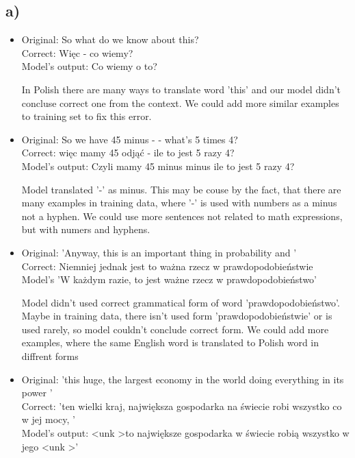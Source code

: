 \documentclass[12pt]{article}
\begin{document}
\subsection*{a) }

\begin{itemize}
  \item Original: So what do we know about this?\\
        Correct: Więc - co wiemy?\\
        Model's output: Co wiemy o to?
        
        In Polish there are many ways to translate word 'this' and  our model didn't concluse correct one from the context. We could add more similar examples to training set to fix this error.
        
  \item Original: So we have 45 minus - - what's 5 times 4?\\
        Correct: więc mamy 45 odjąć - ile to jest 5 razy 4?\\
        Model's output: Czyli mamy 45 minus minus ile to jest 5 razy 4?
        
        Model translated '-' as minus. This may be couse by the fact, that there are many examples in training data, where '-' is used with numbers as a minus not a hyphen. We could use more sentences not related to math expressions, but with numers and hyphens.
        
  \item Original: 'Anyway, this is an important thing in probability and '\\
        Correct: Niemniej jednak jest to ważna rzecz w prawdopodobieństwie\\ 
        Model's 'W każdym razie, to jest ważne rzecz w prawdopodobieństwo'
        
        Model didn't used correct grammatical form of word 'prawdopodobieństwo'. Maybe in training data, there isn't used form 'prawdopodobieństwie' or is used rarely, so model couldn't conclude correct form. We could add more examples, where the same English word is translated to Polish word in diffrent forms
        
  \item Original: 'this huge, the largest economy in the world doing everything in its power '\\
        Correct: 'ten wielki kraj, największa gospodarka na świecie robi wszystko co w jej mocy, '\\
        Model's output: \textless unk \textgreater to największe gospodarka w świecie robią wszystko w jego \textless unk \textgreater '
        

\end{itemize}
\end{document}
